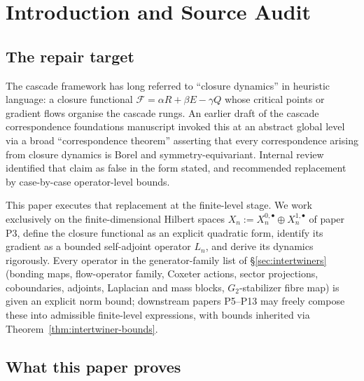 \documentclass[11pt, a4paper]{amsart}
\theoremstyle{definition}
\begin{document}
\begin{abstract}
\emph{No continuum-limit, Gromov--Hausdorff, or
manifold-identification claim is made here. No target-side
metric, hydrodynamic, gauge, spectral, Hecke, cohomology, or CTM
correspondence theorem is in scope; those are P5--P13.}
\end{abstract}

\tableofcontents

\section{Introduction and Source Audit}
\label{sec:intro}

\subsection{The repair target}

The cascade framework has long referred to ``closure dynamics'' in
heuristic language: a closure functional $\mathcal{F} = \alpha R +
\beta E - \gamma Q$ whose critical points or gradient flows
organise the cascade rungs. An earlier draft of the cascade
correspondence foundations manuscript invoked this at an abstract
global level via a broad ``correspondence theorem'' asserting that
every correspondence arising from closure dynamics is Borel and
symmetry-equivariant. Internal review identified that claim as
false in the form stated, and recommended replacement by
case-by-case operator-level bounds.

This paper executes that replacement at the finite-level stage.
We work exclusively on the finite-dimensional Hilbert spaces
$X_n := X_n^{0, \bullet} \oplus X_n^{1, \bullet}$ of paper P3,
define the closure functional as an explicit quadratic form,
identify its gradient as a bounded self-adjoint operator $L_n$,
and derive its dynamics rigorously. Every operator in the
generator-family list of \S\ref{sec:intertwiners} (bonding maps,
flow-operator family, Coxeter actions, sector projections,
coboundaries, adjoints, Laplacian and mass blocks, $G_2$-stabilizer
fibre map) is given an explicit norm bound; downstream papers
P5--P13 may freely compose these into admissible finite-level
expressions, with bounds inherited via
Theorem~\ref{thm:intertwiner-bounds}.

\subsection{What this paper proves}
\end{document}
